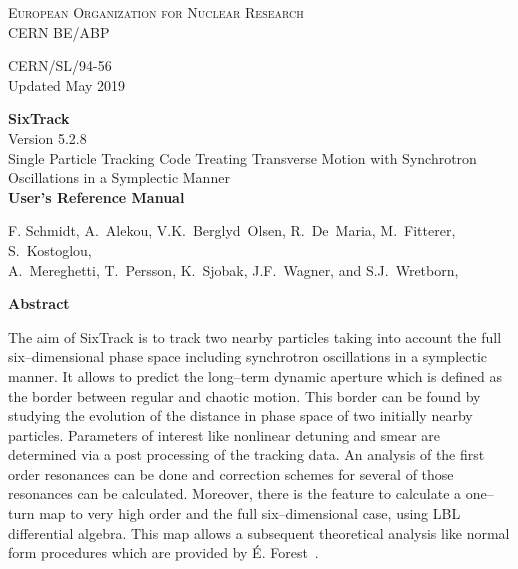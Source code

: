 \begin{titlepage}
\begin{center}\normalsize\scshape
    European Organization for Nuclear Research \\
    CERN BE/ABP
\end{center}
\vspace*{2mm}
\begin{flushright}
    CERN/SL/94-56 \\
    Updated May 2019
\end{flushright}
\begin{center}\Huge
    \textbf{SixTrack} \\
    \LARGE Version 5.2.8 \\
    \vspace*{8mm}Single Particle Tracking Code Treating Transverse Motion with Synchrotron Oscillations in a Symplectic Manner \\
    \vspace*{8mm}\textbf{User's Reference Manual}
\end{center}
\begin{center}
    F. Schmidt,
    A.~Alekou,
    V.K.~Berglyd~Olsen,
    R.~De~Maria,
    M.~Fitterer,
    S.~Kostoglou,\\
    A.~Mereghetti,
    T.~Persson,
    K.~Sjobak,
    J.F.~Wagner,
    and
    S.J.~Wretborn,
\end{center}
\begin{center}\large
    \vspace*{10mm}\textbf{Abstract} \\
\end{center}
The aim of SixTrack is to track two nearby particles taking into account the full six--dimensional phase space including synchrotron oscillations in a symplectic manner.
It allows to predict the long--term dynamic aperture which is defined as the border between regular and chaotic motion.
This border can be found by studying the evolution of the distance in phase space of two initially nearby particles.
Parameters of interest like nonlinear detuning and smear are determined via a post processing of the tracking data.
An analysis of the first order resonances can be done and correction schemes for several of those resonances can be calculated.
Moreover, there is the feature to calculate a one--turn map to very high order and the full six--dimensional case, using LBL differential algebra.
This map allows a subsequent theoretical analysis like normal form procedures which are provided by \'{E}. Forest~\cite{DALIE}.


\end{titlepage}
